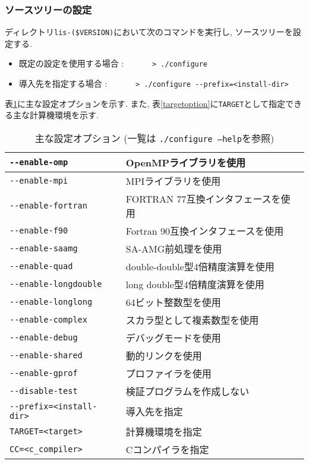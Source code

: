 \documentclass[a4paper]{jarticle}
\begin{document}
\subsubsection{ソースツリーの設定}
ディレクトリ{\tt lis-(\$VERSION)}において次のコマンドを実行し, ソースツリーを設定する. 
\begin{itemize}
\item 既定の設定を使用する場合 : \verb&      > ./configure&
\item 導入先を指定する場合 :   \verb&      > ./configure --prefix=<install-dir>&
\end{itemize}
表\ref{configoption}に主な設定オプションを示す. 
また, 表\ref{targetoption}に\verb+TARGET+として指定できる主な計算機環境を示す. 
\begin{table}[htbp]
\caption{主な設定オプション (一覧は {\tt ./configure --help}を参照) }
\label{configoption}
\begin{center}
\begin{tabular}{|l|l|}
\hline
\verb+--enable-omp+      & OpenMPライブラリを使用\\ \hline
\verb+--enable-mpi+      & MPIライブラリを使用\\ \hline
\verb+--enable-fortran+  & FORTRAN 77互換インタフェースを使用\\ \hline
\verb+--enable-f90    +  & Fortran 90互換インタフェースを使用\\ \hline
\verb+--enable-saamg+    & SA-AMG前処理を使用\\ \hline
\verb+--enable-quad+     & double-double型4倍精度演算を使用\\ \hline
\verb+--enable-longdouble+ & long double型4倍精度演算を使用\\ \hline
\verb+--enable-longlong+ & 64ビット整数型を使用\\ \hline
\verb+--enable-complex+  & スカラ型として複素数型を使用\\ \hline
\verb+--enable-debug+    & デバッグモードを使用\\ \hline
\verb+--enable-shared+   & 動的リンクを使用\\ \hline
\verb+--enable-gprof+    & プロファイラを使用\\ \hline
\verb+--disable-test+    & 検証プログラムを作成しない\\ \hline    
\verb+--prefix=<install-dir>+    & 導入先を指定\\ \hline
\verb+TARGET=<target>+    & 計算機環境を指定\\ \hline
\verb+CC=<c_compiler>+    & Cコンパイラを指定\\ \hline

\end{tabular}
\end{center}
\end{table}
\end{document}
